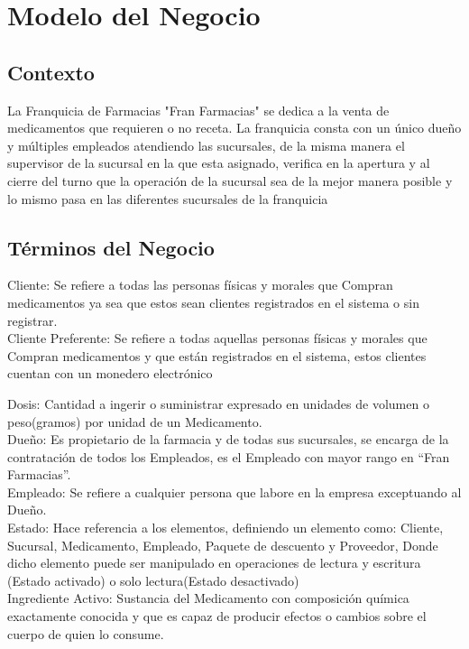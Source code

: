 \chapter{Modelo del Negocio}
\section{Contexto}
La Franquicia de Farmacias "Fran Farmacias" se dedica a la venta de medicamentos que requieren o no receta. La franquicia consta con un único dueño y múltiples empleados atendiendo las sucursales, de la misma manera el supervisor de la sucursal en la que esta asignado, verifica en la apertura y al cierre del turno que la operación de la sucursal sea de la mejor manera posible y lo mismo pasa en las diferentes sucursales de la franquicia\\

\section{Términos del Negocio}

Cliente: Se refiere a todas las personas físicas y morales que Compran medicamentos ya sea que estos sean clientes registrados en el sistema o sin registrar.\\

Cliente Preferente: Se refiere a todas aquellas personas físicas y morales que Compran medicamentos y que están registrados en el sistema, estos clientes cuentan con un monedero electrónico


Dosis: Cantidad a ingerir o suministrar expresado en unidades de volumen o peso(gramos) por unidad de un Medicamento.\\

Dueño: Es propietario de la farmacia y de todas sus sucursales, se encarga de la contratación de todos los Empleados, es el Empleado con mayor rango en “Fran Farmacias”.\\

Empleado: Se refiere a cualquier persona que labore en la empresa exceptuando al Dueño.\\

Estado: Hace referencia a los elementos, definiendo un elemento como: Cliente, Sucursal, Medicamento, Empleado, Paquete de descuento y Proveedor, Donde dicho elemento puede ser manipulado en operaciones de lectura y escritura (Estado activado) o solo lectura(Estado desactivado)\\

Ingrediente Activo: Sustancia del Medicamento con composición química exactamente conocida y que es capaz de producir efectos o cambios sobre el cuerpo de quien lo consume.\\

